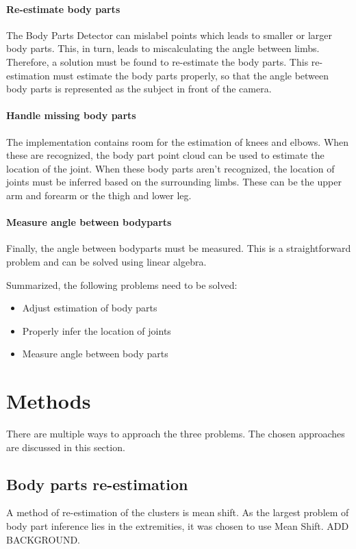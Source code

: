 \documentclass[twoside]{article}
\begin{document}
\begin{multicols}{2}
\paragraph{Re-estimate body parts}
The Body Parts Detector can mislabel points which leads to smaller or larger body parts. This, in turn, leads to miscalculating the angle between limbs. Therefore, a solution must be found to re-estimate the body parts. This re-estimation must estimate the body parts properly, so that the angle between body parts is represented as the subject in front of the camera.

\paragraph{Handle missing body parts}
The implementation contains room for the estimation of knees and elbows. When these are recognized, the body part point cloud can be used to estimate the location of the joint. When these body parts aren't recognized, the location of joints must be inferred based on the surrounding limbs. These can be the upper arm and forearm or the thigh and lower leg. 

\paragraph{Measure angle between bodyparts}
Finally, the angle between bodyparts must be measured. This is a straightforward problem and can be solved using linear algebra.

Summarized, the following problems need to be solved:

\begin{itemize}
\item Adjust estimation of body parts
\item Properly infer the location of joints
\item Measure angle between body parts
\end{itemize}


\section{Methods}
There are multiple ways to approach the three problems. The chosen approaches are discussed in this section.

\subsection{Body parts re-estimation}
A method of re-estimation of the clusters is mean shift. As the largest problem of body part inference lies in the extremities, it was chosen to use Mean Shift. ADD BACKGROUND.


\end{multicols}
\end{document}
